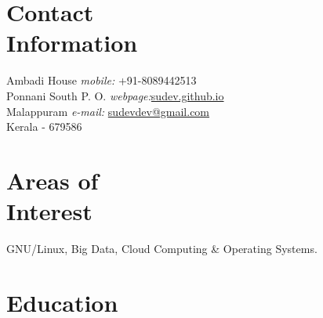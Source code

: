\documentclass[margin,line]{resume}
\begin{document}
\begin{resume}

    \section{\mysidestyle Contact\\Information}
    
        
    Ambadi House   \hfill \textit{mobile:} \hspace{9mm} 		+91-8089442513 \\ 
    Ponnani South P. O.	\hfill \textit{webpage:}\hspace{14mm}\href{http://sudev.github.io}{sudev.github.io}\\
    Malappuram \hfill 	\textit{e-mail:} \hspace{3.6mm}\href{mailto:sudevdev@gmail.com}{sudevdev@gmail.com}     \\
    Kerala - 679586
			
        \vspace{-2.5mm}
        
        \vspace{3mm}
%
					
    \section{\mysidestyle Areas of\\Interest}

   GNU/Linux, Big Data, Cloud Computing \& Operating Systems.
\vspace{3mm}


    \section{\mysidestyle Education}


\end{resume}
\end{document}
